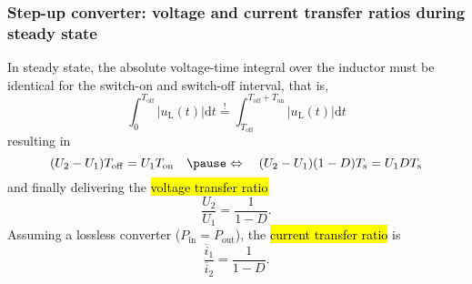 \begin{frame}
    \frametitle{Step-up converter: voltage and current transfer ratios during steady state}
    In steady state, the absolute voltage-time integral over the inductor must be identical for the switch-on and switch-off interval, that is,
    \begin{equation}
        \int_{0}^{T_\mathrm{off}} \left|u_\mathrm{L}(t)\right| \mathrm{d}t \stackrel{!}{=} \int_{T_\mathrm{off}}^{T_\mathrm{off}+T_\mathrm{on}} \left|u_\mathrm{L}(t)\right| \mathrm{d}t
    \end{equation}\pause
    resulting in
    \begin{equation}
            (U_2-U_1)T_\mathrm{off} = U_1T_\mathrm{on} \quad \pause  \Leftrightarrow \quad  (U_2-U_1)(1-D)T_\mathrm{s} = U_1DT_\mathrm{s}
    \end{equation}\pause
    and finally delivering the \hl{voltage transfer ratio}
    \begin{equation}
        \frac{U_2}{U_1} = \frac{1}{1-D}.
    \end{equation}\pause
    Assuming a lossless converter ($P_\mathrm{in}=P_\mathrm{out}$), the \hl{current transfer ratio} is 
    \begin{equation}
        \frac{\overline{i}_1}{\overline{i}_2} = \frac{1}{1-D}.
    \end{equation}
\end{frame}

